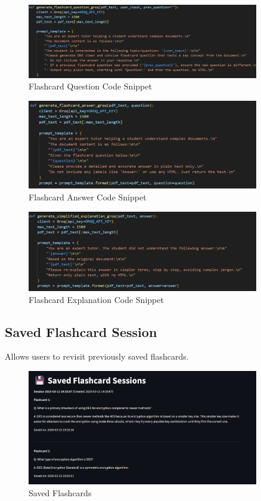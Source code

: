 \documentclass{report}
\begin{document}
\begin{figure}[H]
\centering
\includegraphics[width=0.9\textwidth]{flashcard-groq-code.png}
\caption{Flashcard Question Code Snippet}
\end{figure}
\begin{figure}[H]
\centering
\includegraphics[width=0.9\textwidth]{flashcard-ans-groq-code.png}
\caption{Flashcard Answer Code Snippet}
\end{figure}
\begin{figure}[H]
\centering
\includegraphics[width=0.9\textwidth]{simple-exp-code.png}
\caption{Flashcard Explanation Code Snippet}
\end{figure}

\subsection{Saved Flashcard Session}
Allows users to revisit previously saved flashcards.
\begin{figure}[H]
\centering
\includegraphics[width=0.9\textwidth]{saved-flashcard.png}
\caption{Saved Flashcards}
\end{figure}
\end{document}
